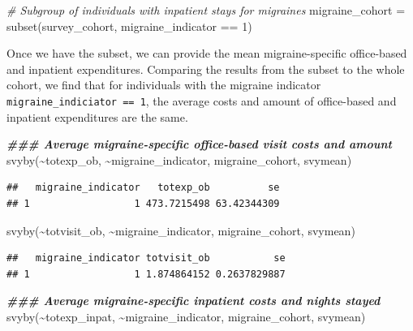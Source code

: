 \documentclass[
]{book}
\newenvironment{Shaded}{\begin{snugshade}}{\end{snugshade}}
\newcommand{\CommentTok}[1]{\textcolor[rgb]{0.56,0.35,0.01}{\textit{#1}}}
\newcommand{\DecValTok}[1]{\textcolor[rgb]{0.00,0.00,0.81}{#1}}
\newcommand{\DocumentationTok}[1]{\textcolor[rgb]{0.56,0.35,0.01}{\textbf{\textit{#1}}}}
\newcommand{\FunctionTok}[1]{\textcolor[rgb]{0.00,0.00,0.00}{#1}}
\newcommand{\NormalTok}[1]{#1}
\newcommand{\OtherTok}[1]{\textcolor[rgb]{0.56,0.35,0.01}{#1}}
\newcommand{\SpecialCharTok}[1]{\textcolor[rgb]{0.00,0.00,0.00}{#1}}
\begin{document}
\begin{Shaded}
\begin{Highlighting}[]
\CommentTok{\# Subgroup of individuals with inpatient stays for migraines}
\NormalTok{migraine\_cohort }\OtherTok{=} \FunctionTok{subset}\NormalTok{(survey\_cohort, migraine\_indicator }\SpecialCharTok{==} \DecValTok{1}\NormalTok{)}
\end{Highlighting}
\end{Shaded}

Once we have the subset, we can provide the mean migraine-specific office-based and inpatient expenditures. Comparing the results from the subset to the whole cohort, we find that for individuals with the migraine indicator \texttt{migraine\_indiciator\ ==\ 1}, the average costs and amount of office-based and inpatient expenditures are the same.

\begin{Shaded}
\begin{Highlighting}[]
\DocumentationTok{\#\#\# Average migraine{-}specific office{-}based visit costs and amount}
\FunctionTok{svyby}\NormalTok{(}\SpecialCharTok{\textasciitilde{}}\NormalTok{totexp\_ob, }\SpecialCharTok{\textasciitilde{}}\NormalTok{migraine\_indicator, migraine\_cohort, svymean)}
\end{Highlighting}
\end{Shaded}

\begin{verbatim}
##   migraine_indicator   totexp_ob          se
## 1                  1 473.7215498 63.42344309
\end{verbatim}

\begin{Shaded}
\begin{Highlighting}[]
\FunctionTok{svyby}\NormalTok{(}\SpecialCharTok{\textasciitilde{}}\NormalTok{totvisit\_ob, }\SpecialCharTok{\textasciitilde{}}\NormalTok{migraine\_indicator, migraine\_cohort, svymean)}
\end{Highlighting}
\end{Shaded}

\begin{verbatim}
##   migraine_indicator totvisit_ob           se
## 1                  1 1.874864152 0.2637829887
\end{verbatim}

\begin{Shaded}
\begin{Highlighting}[]
\DocumentationTok{\#\#\# Average migraine{-}specific inpatient costs and nights stayed}
\FunctionTok{svyby}\NormalTok{(}\SpecialCharTok{\textasciitilde{}}\NormalTok{totexp\_inpat, }\SpecialCharTok{\textasciitilde{}}\NormalTok{migraine\_indicator, migraine\_cohort, svymean)}
\end{Highlighting}
\end{Shaded}
\end{document}
